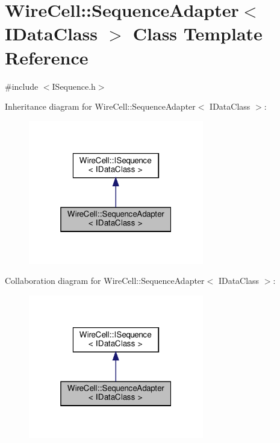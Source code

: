 \hypertarget{class_wire_cell_1_1_sequence_adapter}{}\section{Wire\+Cell\+:\+:Sequence\+Adapter$<$ I\+Data\+Class $>$ Class Template Reference}
\label{class_wire_cell_1_1_sequence_adapter}


{\ttfamily \#include $<$I\+Sequence.\+h$>$}



Inheritance diagram for Wire\+Cell\+:\+:Sequence\+Adapter$<$ I\+Data\+Class $>$\+:
\nopagebreak
\begin{figure}[H]
\begin{center}
\leavevmode
\includegraphics[width=217pt]{class_wire_cell_1_1_sequence_adapter__inherit__graph}
\end{center}
\end{figure}


Collaboration diagram for Wire\+Cell\+:\+:Sequence\+Adapter$<$ I\+Data\+Class $>$\+:
\nopagebreak
\begin{figure}[H]
\begin{center}
\leavevmode
\includegraphics[width=217pt]{class_wire_cell_1_1_sequence_adapter__coll__graph}
\end{center}
\end{figure}
